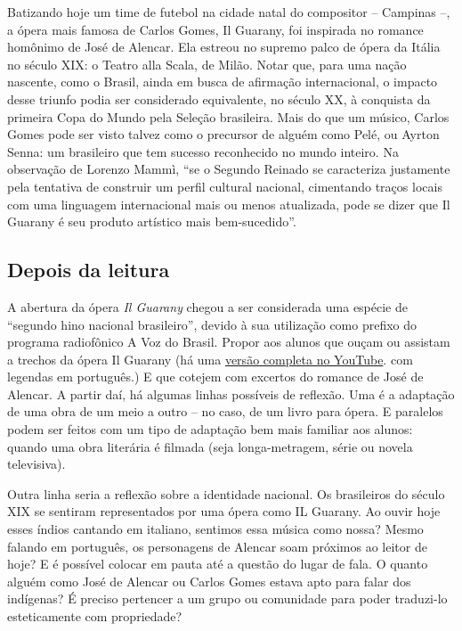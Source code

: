 \documentclass[11pt]{extarticle}
\begin{document}
Batizando hoje um time de futebol na cidade natal do compositor – Campinas –, a
ópera mais famosa de Carlos Gomes, Il Guarany, foi inspirada no romance
homônimo de José de Alencar. Ela estreou no supremo palco de ópera da Itália no
século XIX: o Teatro alla Scala, de Milão. Notar que, para uma nação nascente,
como o Brasil, ainda em busca de afirmação internacional, o impacto desse
triunfo podia ser considerado equivalente, no século XX, à conquista da
primeira Copa do Mundo pela Seleção brasileira. Mais do que um músico, Carlos
Gomes pode ser visto talvez como o precursor de alguém como Pelé, ou Ayrton
Senna: um brasileiro que tem sucesso reconhecido no mundo inteiro. Na
observação de Lorenzo Mammì, “se o Segundo Reinado se caracteriza justamente
pela tentativa de construir um perfil cultural nacional, cimentando traços
locais com uma linguagem internacional mais ou menos atualizada, pode se dizer
que Il Guarany é seu produto artístico mais bem-sucedido”.

\subsection{Depois da leitura}

A abertura da ópera \textit{Il Guarany} chegou a ser considerada uma espécie de
“segundo hino nacional brasileiro”, devido à sua utilização como prefixo do
programa radiofônico A Voz do Brasil. Propor aos alunos que ouçam ou assistam a
trechos da ópera Il Guarany (há uma 
\href{https://www.youtube.com/watch?v=XTIpAyXyvFA&t=3746s}{versão completa no YouTube}. 
com legendas em
português.)
E que cotejem
com excertos do romance de José de Alencar. A partir daí, há algumas linhas
possíveis de reflexão. Uma é a adaptação de uma obra de um meio a outro – no
caso, de um livro para ópera. E paralelos podem ser feitos com um tipo de
adaptação bem mais familiar aos alunos: quando uma obra literária é filmada
(seja longa-metragem, série ou novela televisiva). 

  Outra linha seria a reflexão sobre a identidade nacional. Os brasileiros do
século XIX se sentiram representados por uma ópera como IL Guarany. Ao ouvir
hoje esses índios cantando em italiano, sentimos essa música como nossa? Mesmo
falando em português, os personagens de Alencar soam próximos ao leitor de
hoje? E é possível colocar em pauta até a questão do lugar de fala. O quanto
alguém como José de Alencar ou Carlos Gomes estava apto para falar dos
indígenas? É preciso pertencer a um grupo ou comunidade para poder traduzi-lo
esteticamente com propriedade?
\end{document}
